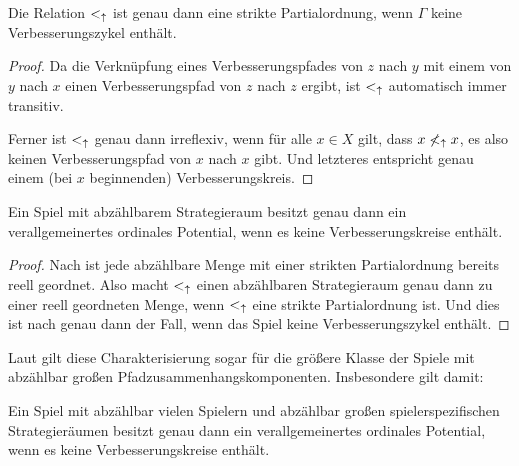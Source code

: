 \begin{prop}\label{prop:VerRelPartOrdVerbz}
	Die Relation $<_\uparrow$ ist genau dann eine strikte Partialordnung, wenn $\Gamma$ keine Verbesserungszykel enthält.
\end{prop}

\begin{proof}
	Da die Verknüpfung eines Verbesserungspfades von $z$ nach $y$ mit einem von $y$ nach $x$ einen Verbesserungspfad von $z$ nach $z$ ergibt, ist $<_\uparrow$ automatisch immer transitiv.
	
	Ferner ist $<_\uparrow$ genau dann irreflexiv, wenn für alle $x \in X$ gilt, dass $x \not<_\uparrow x$, es also keinen Verbesserungspfad von $x$ nach $x$ gibt. Und letzteres entspricht genau einem (bei $x$ beginnenden) Verbesserungskreis.
\end{proof}

\begin{kor}\label{kor:CharExVerOrdPotabzX}
	Ein Spiel mit abzählbarem Strategieraum besitzt genau dann ein verallgemeinertes ordinales Potential, wenn es keine Verbesserungskreise enthält.
\end{kor}

\begin{proof}
	Nach  ist jede abzählbare Menge mit einer strikten Partialordnung bereits reell geordnet. Also macht $<_\uparrow$ einen abzählbaren Strategieraum genau dann zu einer reell geordneten Menge, wenn $<_\uparrow$ eine strikte Partialordnung ist. Und dies ist nach  genau dann der Fall, wenn das Spiel keine Verbesserungszykel enthält.
\end{proof}

Laut  gilt diese Charakterisierung sogar für die größere Klasse der Spiele mit abzählbar großen Pfadzusammenhangskomponenten. Insbesondere gilt damit:

\begin{kor}
	Ein Spiel mit abzählbar vielen Spielern und abzählbar großen spielerspezifischen Strategieräumen besitzt genau dann ein verallgemeinertes ordinales Potential, wenn es keine Verbesserungskreise enthält.
\end{kor}

